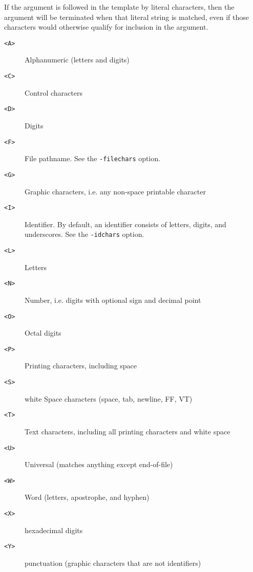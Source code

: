 If the argument is followed in the template by literal characters, then
the argument will be terminated when that literal string is matched,
even if those characters would otherwise qualify for inclusion in the
argument.

\begin{description}
\item[{\tt <A>}]
Alphanumeric (letters and digits)
\item[{\tt <C>}]
Control characters
\item[{\tt <D>}]
Digits
\item[{\tt <F>}]
File pathname.  See the \verb/-filechars/ option.
\item[{\tt <G>}]
Graphic characters, i.e. any non-space printable character
\item[{\tt <I>}]
Identifier.  By default, an identifier consists of letters, digits, and
underscores.  See the \verb/-idchars/ option.
\item[{\tt <L>}]
Letters
\item[{\tt <N>}]
Number, i.e. digits with optional sign and decimal point
\item[{\tt <O>}]
Octal digits
\item[{\tt <P>}]
Printing characters, including space
\item[{\tt <S>}]
white Space characters (space, tab, newline, FF, VT)
\item[{\tt <T>}]
Text characters, including all printing characters and white space
\item[{\tt <U>}]
Universal (matches anything except end-of-file)
\item[{\tt <W>}]
Word (letters, apostrophe, and hyphen)
\item[{\tt <X>}]
hexadecimal digits
\item[{\tt <Y>}]
punctuation (graphic characters that are not identifiers)
\end{description}
